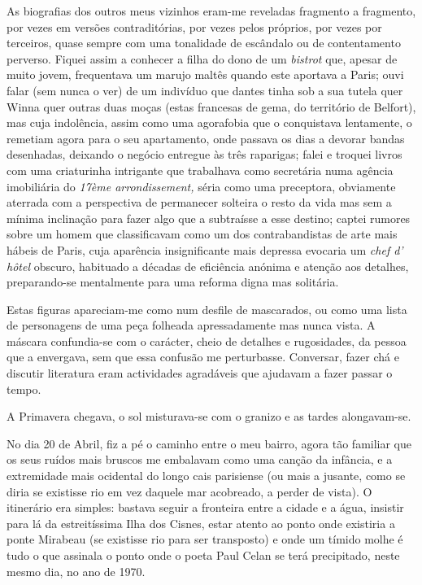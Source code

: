 As biografias dos outros meus vizinhos eram-me reveladas fragmento a
fragmento, por vezes em versões contraditórias, por vezes pelos
próprios, por vezes por terceiros, quase sempre com uma tonalidade de
escândalo ou de contentamento perverso. Fiquei assim a conhecer a
filha do dono de um \emph{bistrot }que, apesar de muito jovem,
frequentava um marujo maltês quando este aportava a Paris; ouvi falar
(sem nunca o ver) de um indivíduo que dantes tinha sob a sua tutela quer
Winna quer outras duas moças (estas francesas de gema, do território de
Belfort), mas cuja indolência, assim como uma agorafobia que o
conquistava lentamente, o remetiam agora para o seu apartamento, onde
passava os dias a devorar bandas desenhadas, deixando o negócio
entregue às três raparigas; falei e troquei livros com uma criaturinha
intrigante que trabalhava como secretária numa agência imobiliária do \emph{17ème arrondissement, }séria como uma preceptora, obviamente aterrada com a
perspectiva de permanecer solteira o resto da vida mas sem a mínima
inclinação para fazer algo que a subtraísse a esse destino; captei
rumores sobre um homem que classificavam como um dos contrabandistas de
arte mais hábeis de Paris, cuja aparência insignificante mais depressa
evocaria um \emph{chef d' hôtel }obscuro, habituado a décadas de
eficiência anónima e atenção aos detalhes, preparando-se mentalmente
para uma reforma digna mas solitária.

Estas figuras apareciam-me como num desfile de mascarados, ou como uma
lista de personagens de uma peça folheada apressadamente mas nunca
vista. A máscara confundia-se com o carácter, cheio de detalhes e
rugosidades, da pessoa que a envergava, sem que essa confusão me
perturbasse. Conversar, fazer chá e discutir literatura eram
actividades agradáveis que ajudavam a fazer passar o tempo.

A Primavera chegava, o sol misturava-se com o granizo e as tardes
alongavam-se.

No dia 20 de Abril, fiz a pé o caminho entre o meu bairro, agora tão
familiar que os seus ruídos mais bruscos me embalavam como uma canção
da infância, e a extremidade mais ocidental do longo cais parisiense (ou
mais a jusante, como se diria se existisse rio em vez daquele mar
acobreado, a perder de vista). O itinerário era simples: bastava seguir
a fronteira entre a cidade e a água, insistir para lá da estreitíssima
Ilha dos Cisnes, estar atento ao ponto onde existiria a ponte Mirabeau
(se existisse rio para ser transposto) e onde um tímido molhe é tudo o
que assinala o ponto onde o poeta Paul Celan se terá precipitado, neste
mesmo dia, no ano de 1970.

